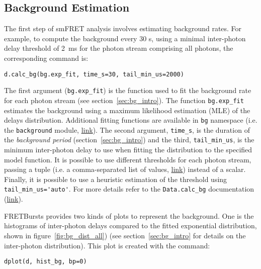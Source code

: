 \subsection{Background Estimation}
\label{sec:bg_calc}

The first step of smFRET analysis involves estimating background rates.
For example, to compute the background every 30 s, using a minimal inter-photon
delay threshold of 2~ms for the photon stream comprising all photons, the corresponding command is:

\begin{lstlisting}
d.calc_bg(bg.exp_fit, time_s=30, tail_min_us=2000)
\end{lstlisting}

The first argument (\verb|bg.exp_fit|) is the function used to fit the
background rate for each photon stream (see section~\ref{sec:bg_intro}).
The function
\verb|bg.exp_fit| estimates the background using a maximum likelihood estimation
(MLE) of the delays distribution.
Additional fitting functions are available in
\verb|bg| namespace 
(i.e. the \verb|background| module, \href{http://fretbursts.readthedocs.org/en/latest/background.html}
{link}). The second argument, \verb|time_s|, is the duration of the
\textit{background period} (section~\ref{sec:bg_intro}) and the third, \verb|tail_min_us|,
is the minimum inter-photon delay to use when fitting the distribution to the specified model function.
It is possible to use different thresholds for each photon stream, passing a
tuple (i.e. a comma-separated list of values, \href{https://docs.python.org/3.5/tutorial/datastructures.html#tuples-and-sequences}{link}) instead of a scalar.
Finally, it is possible to use a heuristic estimation of the threshold using
\verb|tail_min_us='auto'|. For more details refer to the \verb|Data.calc_bg| documentation
(\href{http://fretbursts.readthedocs.org/en/latest/data_class.html#fretbursts.burstlib.Data.calc_bg}{link}).

FRETBursts provides two kinds of plots to represent the background. One is the histograms
of inter-photon delays compared to the fitted exponential distribution, shown in 
figure~\ref{fig:bg_dist_all}) (see section~\ref{sec:bg_intro} for details on the inter-photon distribution). 
This plot is created with the command:

\begin{lstlisting}
dplot(d, hist_bg, bp=0)
\end{lstlisting}


